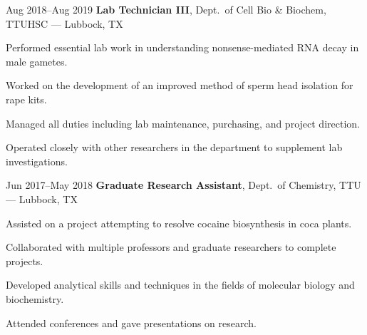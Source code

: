 \documentclass{resume}
\begin{document}
        \begin{twocolentry}{Aug 2018--Aug 2019}
            \textbf{Lab Technician III}, Dept.\ of Cell Bio \& Biochem, TTUHSC --- Lubbock, TX
        \end{twocolentry}
        \vspace{0.10cm}
        \begin{onecolentry}
            \begin{highlights}
                \item Performed essential lab work in understanding nonsense-mediated RNA decay in male gametes.
                \item Worked on the development of an improved method of sperm head isolation for rape kits.
                \item Managed all duties including lab maintenance, purchasing, and project direction.
                \item Operated closely with other researchers in the department to supplement lab investigations.
            \end{highlights}
        \end{onecolentry}
        \vspace{0.2cm}

        \begin{twocolentry}{Jun 2017--May 2018}
            \textbf{Graduate Research Assistant}, Dept.\ of Chemistry, TTU --- Lubbock, TX
        \end{twocolentry}
        \vspace{0.10cm}
        \begin{onecolentry}
            \begin{highlights}
                \item Assisted on a project attempting to resolve cocaine biosynthesis in coca plants.
                \item Collaborated with multiple professors and graduate researchers to complete projects.
                \item Developed analytical skills and techniques in the fields of molecular biology and biochemistry.
                \item Attended conferences and gave presentations on research.
            \end{highlights}
        \end{onecolentry}
        \vspace{0.2cm}
\end{document}
